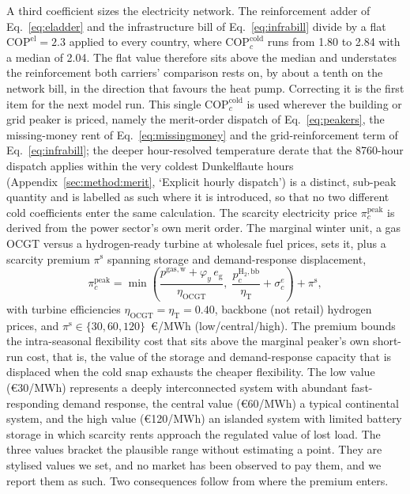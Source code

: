 A third coefficient sizes the electricity network. The reinforcement adder of
Eq.~\eqref{eq:eladder} and the infrastructure bill of Eq.~\eqref{eq:infrabill} divide
by a flat $\mathrm{COP}^{\mathrm{el}}=2.3$ applied to every country, where
$\mathrm{COP}^{\mathrm{cold}}_{c}$ runs from 1.80 to 2.84 with a median of 2.04. The
flat value therefore sits above the median and understates the reinforcement both
carriers' comparison rests on, by about a tenth on the network bill, in the direction
that favours the heat pump. Correcting it is the first item for the next model run.
This single $\mathrm{COP}^{\mathrm{cold}}_{c}$ is used wherever the building or grid
peaker is priced, namely the merit-order dispatch of Eq.~\eqref{eq:peakers}, the
missing-money rent of Eq.~\eqref{eq:missingmoney} and the grid-reinforcement term of
Eq.~\eqref{eq:infrabill}; the deeper hour-resolved temperature derate that the 8760-hour
dispatch applies within the very coldest Dunkelflaute hours
(Appendix~\ref{sec:method:merit}, `Explicit hourly dispatch') is a distinct, sub-peak
quantity and is labelled as such where it is introduced, so that no two different cold
coefficients enter the same calculation. The scarcity electricity price
$\pi^{\mathrm{peak}}_{c}$ is derived from the power sector's own merit order. The
marginal winter unit, a gas OCGT versus a hydrogen-ready turbine at wholesale fuel
prices, sets it, plus a scarcity premium $\pi^{\mathrm{s}}$ spanning storage and
demand-response displacement,
%
\begin{equation}
\label{eq:peakprice}
    \pi^{\mathrm{peak}}_{c}
        = \min\!\left(
            \frac{p^{\mathrm{gas,w}} + \varphi_{y}\, e_{\mathrm{g}}}{\eta_{\mathrm{OCGT}}},\;
            \frac{p^{\mathrm{H_2,bb}}_{c}}{\eta_{\mathrm{T}}} + \sigma^{e}_{c}
          \right) + \pi^{\mathrm{s}},
\end{equation}
%
with turbine efficiencies $\eta_{\mathrm{OCGT}}{=}\eta_{\mathrm{T}}{=}0.40$, backbone
(not retail) hydrogen prices, and $\pi^{\mathrm{s}}\in\{30,60,120\}$~\euro{}/MWh
(low/central/high). The premium bounds the intra-seasonal flexibility cost that sits
above the marginal peaker's own short-run cost, that is, the value of the storage and
demand-response capacity that is displaced when the cold snap exhausts the cheaper
flexibility. The low value (\euro{}30/MWh) represents a deeply interconnected system
with abundant fast-responding demand response, the central value (\euro{}60/MWh) a
typical continental system, and the high value (\euro{}120/MWh) an islanded system with
limited battery storage in which scarcity rents approach the regulated value of lost
load. The three values bracket the plausible range without estimating a point. They are
stylised values we set, and no market has been observed to pay them, and we report them
as such. Two consequences follow from where the premium enters.

